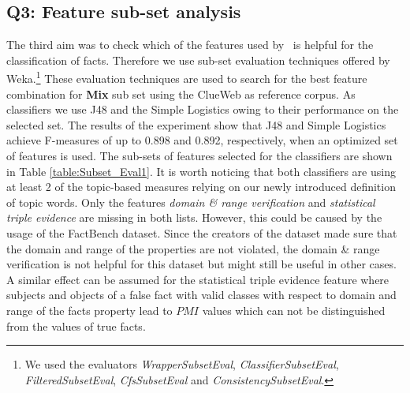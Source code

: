 \subsection{\textbf{Q3:} Feature sub-set analysis}

The third aim was to check which of the features used by \FactCheck\ is helpful for the classification of facts. Therefore we use sub-set evaluation techniques offered by Weka.\footnote{We used the evaluators \textit{WrapperSubsetEval}, \textit{ClassifierSubsetEval}, \textit{FilteredSubsetEval}, \textit{CfsSubsetEval} and \textit{ConsistencySubsetEval}.}
These evaluation techniques are used to search for the best feature combination for \textbf{Mix} sub set using the ClueWeb as reference corpus.
As classifiers we use J48 and the Simple Logistics owing to their performance on the selected set. 
The results of the experiment show that J48 and Simple Logistics achieve F-measures of up to 0.898 and 0.892, respectively, when an optimized set of features is used. The sub-sets of features selected for the classifiers are shown in Table \ref{table:Subset_Eval1}.
It is worth noticing that both classifiers are using at least 2 of the topic-based measures relying on our newly introduced definition of topic words.
Only the features \textit{domain \& range verification} and \textit{statistical triple evidence} are missing in both lists.
However, this could be caused by the usage of the FactBench dataset. Since the creators of the dataset made sure that the domain and range of the properties are not violated, the domain \& range verification is not helpful for this dataset but might still be useful in other cases.
A similar effect can be assumed for the statistical triple evidence feature where subjects and objects of a false fact with valid classes with respect to domain and range of the facts property lead to $PMI$ values which can not be distinguished from the values of true facts.


